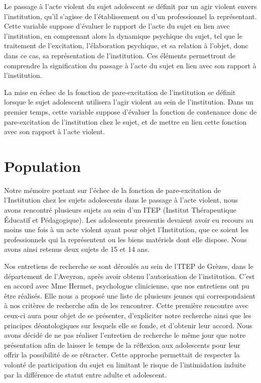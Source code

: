 \documentclass[12pt, a4paper]{book}
\begin{document}
\begin{spacing}{1.5}
Le passage à l'acte violent du sujet adolescent se définit par un agir violent envers l'institution, qu'il s'agisse de l'établissement ou d'un professionnel la représentant. Cette variable suppose d'évaluer le rapport de l'acte du sujet en lien avec l'institution, en comprenant alors la dynamique psychique du sujet, tel que le traitement de l'excitation, l'élaboration psychique, et sa relation à l'objet, donc dans ce cas, sa représentation de l'institution. Ces éléments permettront de comprendre la signification du passage à l'acte du sujet en lien avec son rapport à l'institution.

La mise en échec de la fonction de pare-excitation de l'institution se définit lorsque le sujet adolescent utilisera l'agir violent au sein de l'institution. Dans un premier temps, cette variable suppose d'évaluer la fonction de contenance donc de pare-excitation de l'institution chez le sujet, et de mettre en lien cette fonction avec son rapport à l'acte violent.

\section{Population}

Notre mémoire portant sur l'échec de la fonction de pare-excitation de l'Institution chez les sujets adolescents dans le passage à l'acte violent, nous avons rencontré plusieurs sujets au sein d'un ITEP (Institut Thérapeutique Éducatif et Pédagogique). Les adolescents pressentis devaient avoir eu recours au moins une fois à un acte violent ayant pour objet l'Institution, que ce soient  les professionnels  qui la représentent ou les biens matériels dont elle dispose. Nous avons ainsi retenus deux sujets de 15 et 14 ans.

Nos entretiens de recherche se sont déroulés au sein de l'ITEP de Grèzes, dans le département de l'Aveyron, après avoir obtenu l'autorisation de l'institution. C'est en accord avec Mme Hermet, psychologue clinicienne, que nos entretiens ont pu être réalisés. Elle nous a proposé une liste de plusieurs jeunes qui correspondaient à nos critères de recherche afin de les rencontrer. Cette première rencontre avec ceux-ci aura pour objet  de  se présenter, d'expliciter notre recherche ainsi que les principes déontologiques sur lesquels elle se fonde, et d'obtenir leur accord. Nous avons décidé de ne pas réaliser l'entretien de recherche le même jour que notre présentation  afin de   laisser le temps de la réflexion aux adolescents pour leur offrir la possibilité de se rétracter. Cette approche permettait de respecter la volonté de participation du sujet en limitant le risque de l'intimidation induite par la différence de statut entre adulte et adolescent.


\end{spacing}
\end{document}
